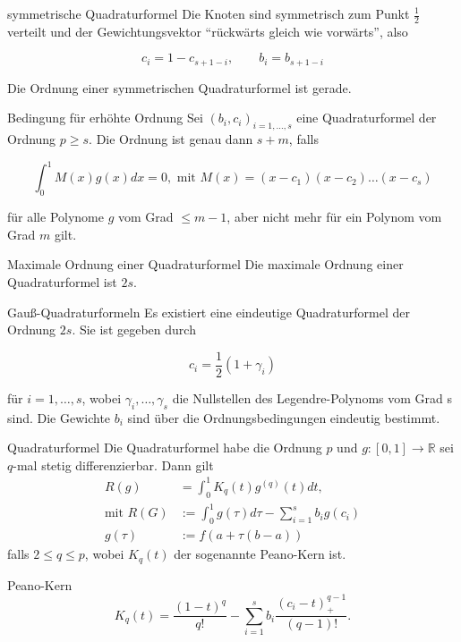 \begin{flashcard}[Definition]{symmetrische Quadraturformel}
	Die Knoten sind symmetrisch zum Punkt $\frac{1}{2}$ verteilt und der Gewichtungsvektor "`rückwärts gleich wie vorwärts"', also

$$ c_i = 1 - c_{s+1-i},\qquad b_i = b_{s + 1 - i}$$

Die Ordnung einer symmetrischen Quadraturformel ist gerade.
\end{flashcard}

\begin{flashcard}[Satz]{Bedingung für erhöhte Ordnung}
	Sei $(b_i, c_i)_{i=1,\ldots,s}$ eine Quadraturformel der Ordnung $p \geq s$. Die Ordnung ist genau dann $s + m$, falls

	$$ \int_0^1 M(x) g(x) dx = 0, \text{ mit } M(x) = (x-c_1)(x-c_2) \dots (x-c_s)$$

	für alle Polynome $g$ vom Grad $\leq m - 1$, aber nicht mehr für ein Polynom vom Grad $m$ gilt.
\end{flashcard}

\begin{flashcard}[Satz]{Maximale Ordnung einer Quadraturformel}
	Die maximale Ordnung einer Quadraturformel ist $2s$.
\end{flashcard}

\begin{flashcard}[Satz]{Gauß-Quadraturformeln}
	Es existiert eine eindeutige Quadraturformel der Ordnung $2s$. Sie ist gegeben durch

	$$ c_i = \frac{1}{2}(1 + \gamma_i) $$

	für $i = 1,\ldots,s$, wobei $\gamma_i,\ldots,\gamma_s$ die Nullstellen des Legendre-Polynoms vom Grad s sind.
	Die Gewichte $b_i$ sind über die Ordnungsbedingungen eindeutig bestimmt.
\end{flashcard}

\begin{flashcard}[Satz]{Quadraturformel}
	Die Quadraturformel habe die Ordnung $p$ und $g : [0, 1] \rightarrow \mathbb{R}$ sei $q$-mal stetig differenzierbar.
	Dann gilt
	{\begin{align*}
		R(g) &= \int_0^1 K_q(t) g^{(q)}(t) dt,\\
		\text{mit } R(G) &:= \int_0^1 g(\tau) d\tau - \sum_{i=1}^s b_i g(c_i)\\
		g(\tau) &:= f(a + \tau(b-a))
	\end{align*}}
	falls $2 \leq q \leq p$, wobei $K_q(t)$ der sogenannte Peano-Kern ist.
\end{flashcard}

\begin{flashcard}[Definition]{Peano-Kern}
$$ K_q(t) = \frac{(1-t)^q}{q!} - \sum_{i=1}^s b_i \frac{(c_i - t)_{+}^{q-1}}{(q-1)!}.$$
\end{flashcard}
